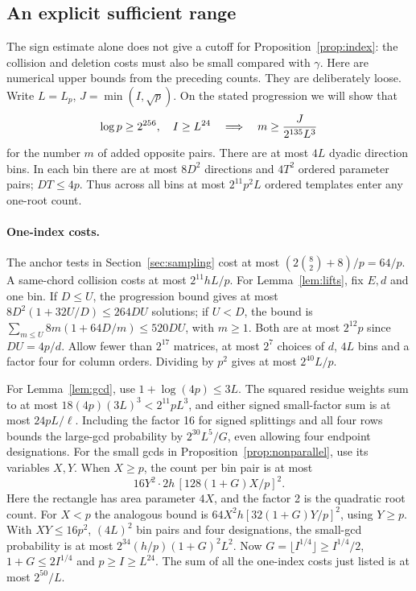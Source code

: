 \subsection{An explicit sufficient range}\label{sec:effective}
The sign estimate alone does not give a cutoff for Proposition~\ref{prop:index}: the collision and deletion costs must also be small compared with $\gamma$. Here are numerical upper bounds from the preceding counts. They are deliberately loose. Write $L=L_p$, $J=\min(I,\sqrt p)$. On the stated progression we will show that
\begin{equation}\label{eq:explicit-index}
 \mathcopy{log(p) >= 2^256 and I >= L_p^24 imply m >= 2^(-135) min(I, sqrt(p)) / (L_p^3).}{\log p\ge 2^{256},\quad I\ge L^{24}
 \quad\Longrightarrow\quad m\ge \frac{J}{2^{135}L^3}}
\end{equation}
for the number $m$ of added opposite pairs. There are at most $4L$ dyadic direction bins. In each bin there are at most $8D^2$ directions and $4T^2$ ordered parameter pairs; $DT\le4p$. Thus across all bins at most $2^{11}p^2L$ ordered templates enter any one-root count.

\paragraph{One-index costs.} The anchor tests in Section~\ref{sec:sampling} cost at most $(2\binom82+8)/p=64/p$. A same-chord collision costs at most $2^{11}hL/p$. For Lemma~\ref{lem:lifts}, fix $E,d$ and one bin. If $D\le U$, the progression bound gives at most $8D^2(1+32U/D)\le264DU$ solutions; if $U<D$, the bound is $\sum_{m\le U}8m(1+64D/m)\le520DU$, with $m\ge1$. Both are at most $2^{12}p$ since $DU=4p/d$. Allow fewer than $2^{17}$ matrices, at most $2^7$ choices of $d$, $4L$ bins and a factor four for column orders. Dividing by $p^2$ gives at most $2^{40}L/p$.

For Lemma~\ref{lem:gcd}, use $1+\log(4p)\le3L$. The squared residue weights sum to at most $18(4p)(3L)^3<2^{11}pL^3$, and either signed small-factor sum is at most $24pL/\ell$. Including the factor 16 for signed splittings and all four rows bounds the large-gcd probability by $2^{30}L^5/G$, even allowing four endpoint designations. For the small gcds in Proposition~\ref{prop:nonparallel}, use its variables $X,Y$. When $X\ge p$, the count per bin pair is at most
\[
  16Y^2\cdot 2h\,[128(1+G)X/p]^2.
\]
Here the rectangle has area parameter $4X$, and the factor 2 is the quadratic root count. For $X<p$ the analogous bound is $64X^2 h[32(1+G)Y/p]^2$, using $Y\ge p$. With $XY\le16p^2$, $(4L)^2$ bin pairs and four designations, the small-gcd probability is at most $2^{34}(h/p)(1+G)^2 L^2$. Now $G=\lfloor I^{1/4}\rfloor\ge I^{1/4}/2$, $1+G\le2I^{1/4}$ and $p\ge I\ge L^{24}$. The sum of all the one-index costs just listed is at most $2^{50}/L$.

